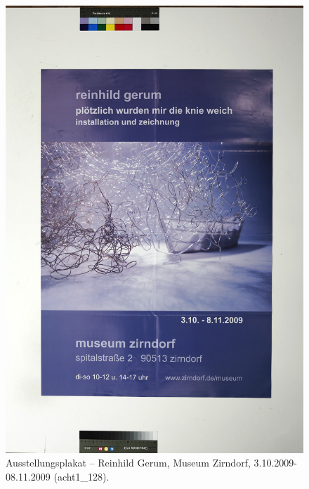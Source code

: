 \documentclass[a4paper,12pt,ngerman]{article}
\begin{document}
\newpage
\begin{figure}[ht]
\includegraphics[width=\linewidth]{Abbildung_32_(acht1_128)}
\centering
\caption{Ausstellungsplakat – Reinhild Gerum, Museum Zirndorf, 3.10.2009-08.11.2009 (acht1\_128).}
\end{figure}
\end{document}
